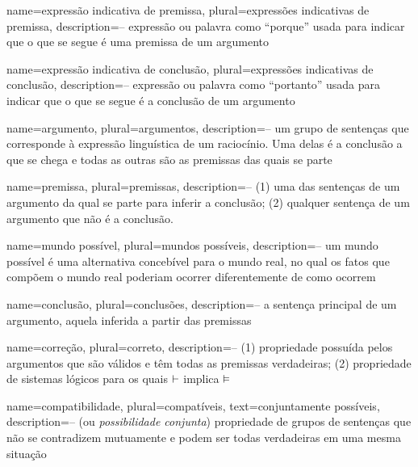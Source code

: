 

\makeglossaries



{
 name=expressão indicativa de premissa,
 plural=expressões indicativas de premissa,
 description={-- expressão ou palavra como ``porque'' usada para indicar que o que se segue é uma premissa de um argumento}
}

{
 name=expressão indicativa de conclusão,
 plural=expressões indicativas de conclusão,
 description={-- expressão ou palavra como ``portanto'' usada para indicar que o que se segue é a conclusão de um argumento}
}

{
 name=argumento,
 plural=argumentos,
 description={-- um grupo de sentenças que corresponde à expressão linguística de um raciocínio. Uma delas é a conclusão a que se chega e todas as outras são as premissas das quais se parte}
}

{
 name=premissa,
 plural=premissas,
 description={-- (1) uma das sentenças de um argumento da qual se parte para inferir a conclusão; (2) qualquer sentença de um argumento que não é a conclusão.}
}

{
 name=mundo possível,
 plural=mundos possíveis,
 description={-- um mundo possível é uma alternativa concebível para o mundo real, no qual os fatos que compõem o mundo real poderiam ocorrer diferentemente de como ocorrem}
}

{
 name=conclusão,
 plural=conclusões,
 description={-- a sentença principal de um argumento, aquela inferida a partir das premissas}
}

{
 name=correção,
 plural=correto,
 description={-- (1) propriedade possuída pelos argumentos que são válidos e têm todas as premissas verdadeiras; (2) propriedade de sistemas lógicos para os quais $\vdash$ implica $\vDash$}
}

{
 name=compatibilidade,
 plural=compatíveis,
 text={conjuntamente possíveis}, %
 description={-- (ou \textit{possibilidade conjunta}) propriedade de grupos de sentenças que não se contradizem mutuamente e podem ser todas verdadeiras em uma mesma situação}
}

